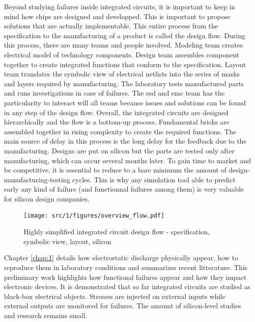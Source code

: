 Beyond studying failures inside integrated circuits, it is important to keep in mind how chips are designed and developped.
This is important to propose solutions that are actually implementable.
This entire process from the specification to the manufacturing of a product is called the design flow.
During this process, there are many teams and people involved.
Modeling team creates electrical model of technology components.
Design team assembles component together to create integrated functions that conform to the specification.
Layout team translates the symbolic view of electrical netlists into the series of masks and layers required by manufacturing.
The laboratory tests manufactured parts and runs investigations in case of failures.
The \gls{esd} and \gls{emc} team has the particularity to interact will all teams because issues and solutions can be found in any step of the design flow.
Overall, the integrated circuits are designed hierarchically and the flow is a bottom-up process.
Fundamental bricks are assembled together in rising complexity to create the required functions.
The main source of delay in this process is the long delay for the feedback due to the manufacturing.
Designs are put on silicon but the parts are tested only after manufacturing, which can occur several months later.
To gain time to market and be competitive, it is essential to reduce to a bare minimum the amount of design-manufacturing-testing cycles.
This is why any simulation tool able to predict early any kind of failure (and functionnal failures among them) is very valuable for silicon design companies.

\begin{figure}[!h]
  \centering
  \texttt{[image: src/1/figures/overview\_flow.pdf]}
  \caption{Highly simplified integrated circuit design flow - specification, symbolic view, layout, silicon}
  \label{fig:ic-design-flow}
\end{figure}

%
Chapter \ref{chap:1} details how electrostatic discharge physically appear, how to reproduce them in laboratory conditions and summarizes recent litterature.
This preliminary work highlights how functional failures appear and how they impact electronic devices.
It is demonstrated that so far integrated circuits are studied as black-box electrical objects.
Stresses are injected on external inputs while external outputs are monitored for failures.
The amount of silicon-level studies and research remains small.


